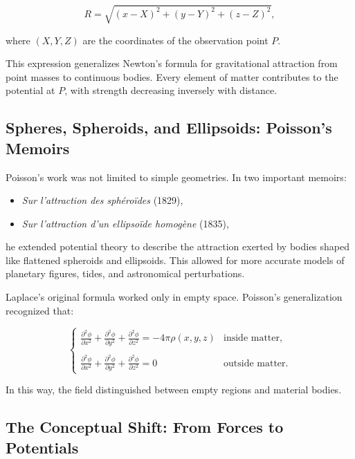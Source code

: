 \[
R = \sqrt{ (x - X)^2 + (y - Y)^2 + (z - Z)^2 },
\]

where \((X,Y,Z)\) are the coordinates of the observation point \(P\).

\medskip

This expression generalizes Newton’s formula for gravitational attraction from point masses to continuous bodies. Every element of matter contributes to the potential at \(P\), with strength decreasing inversely with distance.

\subsection{Spheres, Spheroids, and Ellipsoids: Poisson's Memoirs}

Poisson's work was not limited to simple geometries. In two important memoirs:

\begin{itemize}
    \item \emph{Sur l'attraction des sphéroïdes} (1829),
    \item \emph{Sur l'attraction d'un ellipsoïde homogène} (1835),
\end{itemize}

he extended potential theory to describe the attraction exerted by bodies shaped like flattened spheroids and ellipsoids. This allowed for more accurate models of planetary figures, tides, and astronomical perturbations.

\medskip

Laplace’s original formula worked only in empty space. Poisson’s generalization recognized that:

\[
\begin{cases}
\frac{\partial^2 \phi}{\partial x^2} 
+ \frac{\partial^2 \phi}{\partial y^2} 
+ \frac{\partial^2 \phi}{\partial z^2} 
= - 4\pi \rho(x,y,z) & \text{inside matter}, \\
\\
\frac{\partial^2 \phi}{\partial x^2} 
+ \frac{\partial^2 \phi}{\partial y^2} 
+ \frac{\partial^2 \phi}{\partial z^2} 
= 0 & \text{outside matter}.
\end{cases}
\]

In this way, the field distinguished between empty regions and material bodies.

\subsection{The Conceptual Shift: From Forces to Potentials}

